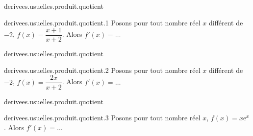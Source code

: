 \begin{qcm}{derivees.usuelles.produit.quotient}
    \begin{question}{derivees.usuelles.produit.quotient.1}
          Posons pour tout nombre réel \(x\) différent de \(-2\), \(f(x)=\dfrac{x+1}{x+2} \). Alors \( f'(x)=\ldots\)
         \begin{multicols}{3}
          \begin{reponses}
  		 \lastchoices
  		 
  		 \phantom{foo}
          \end{reponses}
         \end{multicols}
    \end{question}
\end{qcm}

\begin{qcm}{derivees.usuelles.produit.quotient}
    \begin{question}{derivees.usuelles.produit.quotient.2}
         Posons pour tout nombre réel \(x\) différent de \(-2\), \( f(x)=\dfrac{2x}{x+2} \). Alors \( f'(x)=\ldots\)
         \begin{multicols}{3}     
	  \begin{reponses}
  		 \lastchoices
  		 
  		 \phantom{foo}
          \end{reponses}
         \end{multicols}
    \end{question}
\end{qcm}

\begin{qcm}{derivees.usuelles.produit.quotient}
    \begin{question}{derivees.usuelles.produit.quotient.3}
        Posons pour tout nombre réel \(x\), \( f(x)=x {\mathrm{e}}^x \). Alors \( f'(x)=\ldots\)
         \begin{multicols}{3} 
	  \begin{reponses}
 		 \lastchoices
  		 
  		 
  		 \phantom{foo}
          \end{reponses}
         \end{multicols}
    \end{question}
\end{qcm}

